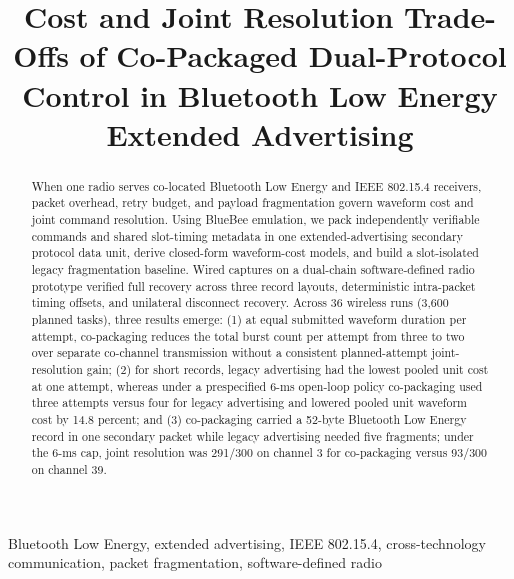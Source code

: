 \documentclass[conference]{IEEEtran}
\begin{document}
\title{Cost and Joint Resolution Trade-Offs of Co-Packaged Dual-Protocol Control in Bluetooth Low Energy Extended Advertising}

\author{
}

\maketitle

\begin{abstract}
When one radio serves co-located Bluetooth Low Energy and IEEE 802.15.4 receivers, packet overhead, retry budget, and payload fragmentation govern waveform cost and joint command resolution. Using BlueBee emulation, we pack independently verifiable commands and shared slot-timing metadata in one extended-advertising secondary protocol data unit, derive closed-form waveform-cost models, and build a slot-isolated legacy fragmentation baseline. Wired captures on a dual-chain software-defined radio prototype verified full recovery across three record layouts, deterministic intra-packet timing offsets, and unilateral disconnect recovery. Across 36 wireless runs (3,600 planned tasks), three results emerge: (1) at equal submitted waveform duration per attempt, co-packaging reduces the total burst count per attempt from three to two over separate co-channel transmission without a consistent planned-attempt joint-resolution gain; (2) for short records, legacy advertising had the lowest pooled unit cost at one attempt, whereas under a prespecified 6-ms open-loop policy co-packaging used three attempts versus four for legacy advertising and lowered pooled unit waveform cost by 14.8 percent; and (3) co-packaging carried a 52-byte Bluetooth Low Energy record in one secondary packet while legacy advertising needed five fragments; under the 6-ms cap, joint resolution was 291/300 on channel 3 for co-packaging versus 93/300 on channel 39.
\end{abstract}

\begin{IEEEkeywords}
Bluetooth Low Energy, extended advertising, IEEE 802.15.4, cross-technology communication, packet fragmentation, software-defined radio
\end{IEEEkeywords}


% 







\end{document}
